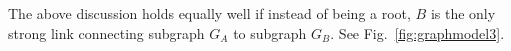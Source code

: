 The above discussion holds equally well if instead of being a root, $B$ is the only strong
link connecting subgraph $G_A$ to subgraph $G_B$. See Fig.~\ref{fig:graphmodel3}.










